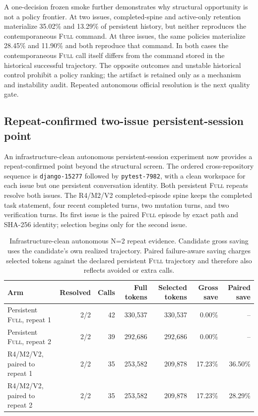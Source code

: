 \documentclass[11pt]{article}
\begin{document}
A one-decision frozen smoke further demonstrates why structural opportunity is
not a policy frontier. At two issues, completed-spine and active-only retention
materialize 35.02\% and 13.29\% of persistent history, but neither reproduces
the contemporaneous \textsc{Full} command. At three issues, the same policies
materialize 28.45\% and 11.90\% and both reproduce that command. In both cases
the contemporaneous \textsc{Full} call itself differs from the command stored
in the historical successful trajectory. The opposite outcomes and unstable
historical control prohibit a policy ranking; the artifact is retained only as
a mechanism and instability audit. Repeated autonomous official resolution is
the next quality gate.

\subsection{Repeat-confirmed two-issue persistent-session point}

An infrastructure-clean autonomous persistent-session experiment now
provides a repeat-confirmed point beyond the structural screen.  The ordered
cross-repository sequence is \texttt{django-15277} followed by
\texttt{pytest-7982}, with a clean workspace for each issue but one persistent
conversation identity.  Both persistent \textsc{Full} repeats resolve both
issues.  The R4/M2/V2 completed-episode spine keeps the completed task
statement, four recent completed turns, two mutation turns, and two
verification turns.  Its first issue is the paired \textsc{Full} episode by
exact path and SHA-256 identity; selection begins only for the second issue.

\begin{table}[H]
\centering
\scriptsize
\caption{Infrastructure-clean autonomous N=2 repeat evidence. Candidate
gross saving uses the candidate's own realized trajectory. Paired
failure-aware saving charges selected tokens against the declared persistent
\textsc{Full} trajectory and therefore also reflects avoided or extra calls.}
\label{tab:persistent-autonomous-discovery}
\begin{tabular}{lrrrrrr}
\toprule
Arm & Resolved & Calls & Full tokens & Selected tokens & Gross save & Paired save \\
\midrule
Persistent \textsc{Full}, repeat 1 & 2/2 & 42 & 330,537 & 330,537 & 0.00\% & -- \\
Persistent \textsc{Full}, repeat 2 & 2/2 & 39 & 292,686 & 292,686 & 0.00\% & -- \\
R4/M2/V2, paired to repeat 1 & 2/2 & 35 & 253,582 & 209,878 & 17.23\% & 36.50\% \\
R4/M2/V2, paired to repeat 2 & 2/2 & 35 & 253,582 & 209,878 & 17.23\% & 28.29\% \\
\bottomrule
\end{tabular}
\end{table}
\end{document}
